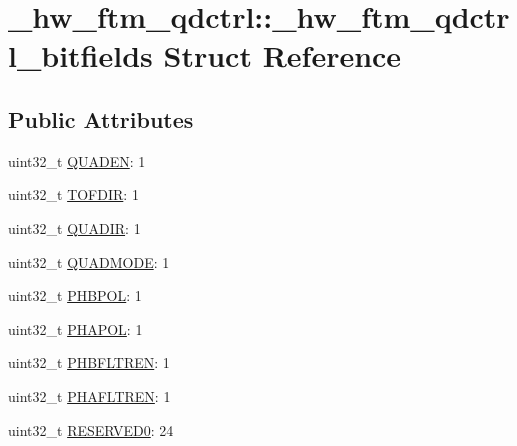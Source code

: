 \hypertarget{struct__hw__ftm__qdctrl_1_1__hw__ftm__qdctrl__bitfields}{}\section{\+\_\+hw\+\_\+ftm\+\_\+qdctrl\+:\+:\+\_\+hw\+\_\+ftm\+\_\+qdctrl\+\_\+bitfields Struct Reference}
\label{struct__hw__ftm__qdctrl_1_1__hw__ftm__qdctrl__bitfields}
\subsection*{Public Attributes}
\begin{DoxyCompactItemize}
\item 
uint32\+\_\+t \hyperlink{struct__hw__ftm__qdctrl_1_1__hw__ftm__qdctrl__bitfields_ad917d3797e606d24fd7de16a46023924}{Q\+U\+A\+D\+EN}\+: 1
\item 
uint32\+\_\+t \hyperlink{struct__hw__ftm__qdctrl_1_1__hw__ftm__qdctrl__bitfields_ab928edd181bc15e82db9bf887c773d3b}{T\+O\+F\+D\+IR}\+: 1
\item 
uint32\+\_\+t \hyperlink{struct__hw__ftm__qdctrl_1_1__hw__ftm__qdctrl__bitfields_aef99247d28ebbc89520ab082a8c07807}{Q\+U\+A\+D\+IR}\+: 1
\item 
uint32\+\_\+t \hyperlink{struct__hw__ftm__qdctrl_1_1__hw__ftm__qdctrl__bitfields_aad0263ef9dbfdbb1345259fcb9a7ff36}{Q\+U\+A\+D\+M\+O\+DE}\+: 1
\item 
uint32\+\_\+t \hyperlink{struct__hw__ftm__qdctrl_1_1__hw__ftm__qdctrl__bitfields_aa909c815bad4d12ef5f3ab2beba3c06f}{P\+H\+B\+P\+OL}\+: 1
\item 
uint32\+\_\+t \hyperlink{struct__hw__ftm__qdctrl_1_1__hw__ftm__qdctrl__bitfields_ae6dca25ad8a55892d4d168370ccd2c9b}{P\+H\+A\+P\+OL}\+: 1
\item 
uint32\+\_\+t \hyperlink{struct__hw__ftm__qdctrl_1_1__hw__ftm__qdctrl__bitfields_adbd3fa2de9ab85a89499c42b98cb7979}{P\+H\+B\+F\+L\+T\+R\+EN}\+: 1
\item 
uint32\+\_\+t \hyperlink{struct__hw__ftm__qdctrl_1_1__hw__ftm__qdctrl__bitfields_a1bcd7d5fc0da9252022d0a2ad14e8616}{P\+H\+A\+F\+L\+T\+R\+EN}\+: 1
\item 
uint32\+\_\+t \hyperlink{struct__hw__ftm__qdctrl_1_1__hw__ftm__qdctrl__bitfields_a77f69141c2fda6252e39cd57e3831584}{R\+E\+S\+E\+R\+V\+E\+D0}\+: 24
\end{DoxyCompactItemize}


